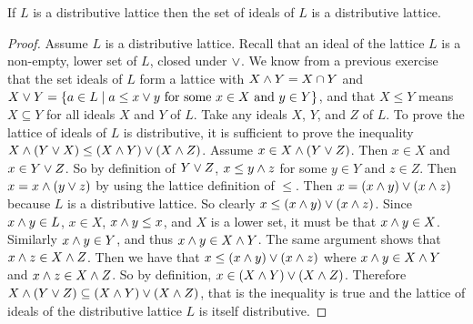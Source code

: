 
\begin{theorem*}
If $L$ is a distributive lattice then the set of ideals of $L$ is a distributive lattice.
\end{theorem*}

\begin{proof}
Assume $L$ is a distributive lattice.
Recall that an ideal of the lattice $L$ is a non-empty, lower set of $L$, closed under $\vee$.
We know from a previous exercise that the set ideals of $L$ form a lattice with $X \wedge Y = X \cap Y$ and $X \vee Y = \{ a \in L \mid a \leq x \vee y \text{ for some } x \in X \text{ and } y \in Y \}$, and that $X\leq Y$ means $X\subseteq Y$ for all ideals $X$ and $Y$ of $L$.
Take any ideals $X$, $Y$, and $Z$ of $L$.
To prove the lattice of ideals of $L$ is distributive, it is sufficient to prove the inequality
$X\wedge (Y \vee X) \leq (X\wedge Y) \vee (X\wedge Z)$.
Assume $x\in X \wedge (Y\vee Z)$.
Then $x \in X$ and $x \in Y \vee Z$.
So by definition of $Y \vee Z$, $x \leq y \wedge z$ for some $y \in Y$ and $z \in Z$.
Then $x = x \wedge (y \vee z)$ by using the lattice definition of $\leq$.
Then $x = (x \wedge y) \vee (x\wedge z)$ because $L$ is a distributive lattice.
So clearly $x \leq (x \wedge y) \vee (x\wedge z)$.
Since $x \wedge y \in L$, $x \in X$, $x \wedge y \leq x$, and $X$ is a lower set, it must be that $x \wedge y \in X$.
Similarly $x\wedge y \in Y$, and thus $x\wedge y \in X \wedge Y$.
The same argument shows that $x \wedge z \in X \wedge Z$.
Then we have that $x \leq (x \wedge y) \vee (x\wedge z)$ where $x \wedge y \in X \wedge Y$ and $x \wedge z \in X \wedge Z$.
So by definition, $x \in (X\wedge Y) \vee (X\wedge Z)$.
Therefore $X \wedge (Y\vee Z) \subseteq (X\wedge Y) \vee (X\wedge Z)$, that is the inequality is true and the lattice of ideals of the distributive lattice $L$ is itself distributive.
\end{proof}

